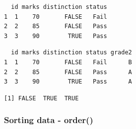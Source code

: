 \documentclass[
  letterpaper,
  DIV=11,
  numbers=noendperiod]{scrartcl}
\newenvironment{Shaded}{\begin{snugshade}}{\end{snugshade}}
\newcommand{\ConstantTok}[1]{\textcolor[rgb]{0.56,0.35,0.01}{#1}}
\newcommand{\DecValTok}[1]{\textcolor[rgb]{0.68,0.00,0.00}{#1}}
\newcommand{\FunctionTok}[1]{\textcolor[rgb]{0.28,0.35,0.67}{#1}}
\newcommand{\NormalTok}[1]{\textcolor[rgb]{0.00,0.23,0.31}{#1}}
\newcommand{\OtherTok}[1]{\textcolor[rgb]{0.00,0.23,0.31}{#1}}
\newcommand{\SpecialCharTok}[1]{\textcolor[rgb]{0.37,0.37,0.37}{#1}}
\newcommand{\StringTok}[1]{\textcolor[rgb]{0.13,0.47,0.30}{#1}}
\begin{document}
\begin{verbatim}
  id marks distinction status
1  1    70       FALSE   Fail
2  2    85       FALSE   Pass
3  3    90        TRUE   Pass
\end{verbatim}

\begin{Shaded}
\end{Shaded}

\begin{verbatim}
  id marks distinction status grade2
1  1    70       FALSE   Fail      B
2  2    85       FALSE   Pass      A
3  3    90        TRUE   Pass      A
\end{verbatim}

\begin{Shaded}
\end{Shaded}

\begin{verbatim}
[1] FALSE  TRUE  TRUE
\end{verbatim}

\subsubsection{Sorting data - order()}\label{sorting-data---order}

\begin{Shaded}
\end{Shaded}
\end{document}
